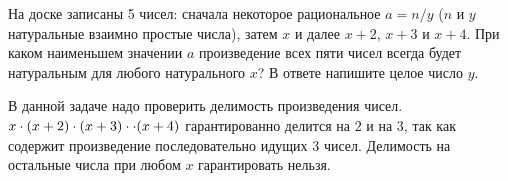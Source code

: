 
На доске записаны 5 чисел: сначала некоторое рациональное $a=n/y$ ($n$ и $y$ натуральные взаимно простые числа), затем $x$ и далее $x+2$, $x+3$ и $x+4$. При каком наименьшем значении $a$ произведение всех пяти чисел всегда будет натуральным для любого натурального $x$? В ответе напишите целое число $y$.

\solutionSection

В данной задаче надо проверить делимость произведения чисел. $x\cdot (x + 2)\cdot(x + 3) \cdot \linebreak \cdot (x + 4)$ гарантированно делится на $2$ и на $3$, так как содержит произведение последовательно идущих $3$ чисел. Делимость на остальные числа при любом $x$ гарантировать нельзя.


